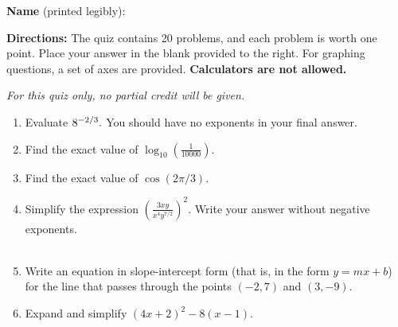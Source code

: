 \documentclass[12pt]{article}
\begin{document}
\textbf{Name} (printed legibly): \fbox{\strut\hspace{4in} }

\textbf{Directions:} The quiz contains 20 problems, and each problem is worth one point. Place your answer in the blank provided to the right. For graphing questions, a set of axes are provided. {\bf Calculators are not allowed.}%

{\em For this quiz only, no partial credit will be given.}

\begin{enumerate}
\item Evaluate ${\large{8^{-2/3}}}.$ You should have no exponents in your final answer.

\quad \hfill \underline{\hspace{2in}}
\vfill

\item Find the exact value of  $\displaystyle{\log_{10}{\left(\frac{1}{10000}\right)}}.$

\quad \hfill \underline{\hspace{2in}}
\vfill

\item Find the exact value of $\cos ( 2 \pi /3).$

\quad \hfill \underline{\hspace{2in}}
\vfill

\item  Simplify the expression $\displaystyle{\left(\frac{3xy}{x^4y^{7/2}} \right)^2}$. Write your answer without negative exponents.\\
\quad \\

\quad \hfill \underline{\hspace{2in}}
\vfill

\item Write an equation in slope-intercept form (that is, in the form $y=mx+b$) for the line that passes through the points $(-2,7)$ and $(3,-9)$.\\

\quad \hfill \underline{\hspace{2in}}
\vfill
\newpage

\item Expand and simplify $(4x+2)^2-8(x-1).$ \\


\end{enumerate}
\end{document}
